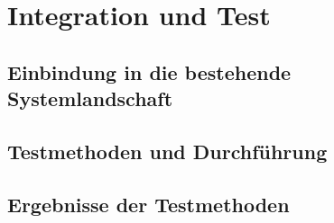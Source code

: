
\newpage
\section{Integration und Test}
\label{Integration und Test}

\subsection{Einbindung in die bestehende Systemlandschaft}

\subsection{Testmethoden und Durchführung}

\subsection{Ergebnisse der Testmethoden}
